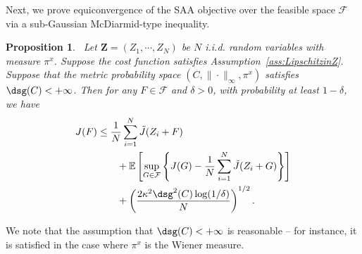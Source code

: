 \documentclass[11pt,leqno]{amsart}
\newtheorem{proposition}{Proposition}
\begin{document}
Next, we prove equiconvergence of the SAA objective over the feasible space $\mathcal{F}$ via a sub-Gaussian McDiarmid-type inequality.

\begin{proposition}~\label{thm:equiconv}
    Let $\mathbf{Z} = (Z_1,\cdots,Z_N)$ be $N$ i.i.d. random variables with measure $\pi^x$. Suppose the cost function satisfies Assumption~\ref{ass:LipschitzinZ}. Suppose that the metric probability space $(C,\|\cdot\|_\infty,\pi^x)$ satisfies $\dsg(C) < +\infty$. Then for any $F\in\mathcal F$ and  $\delta>0$, with probability at least $1-\delta$, we have 
    \begin{equation}\label{eq:sample-complex1}
       \begin{aligned}
        J(F) &\leq \frac{1}{N} \sum_{i=1}^N \tilde J(Z_i+F)\\
        &\qquad+\mathbb E \left[\sup_{G \in \mathcal{F}} \left \{J(G) - \frac{1}{N} \sum_{i=1}^N \tilde J(Z_i+G) \right\} \right]\\
        &\qquad+\left(\frac{2\kappa^2\dsg^2(C) \log(1/\delta)}{N}\right)^{1/2}.
    \end{aligned}
    \end{equation}
\end{proposition}
 We note that the assumption that $\dsg(C) < +\infty$ is reasonable -- for instance, it is satisfied in the case where $\pi^x$ is the Wiener measure.
\end{document}
